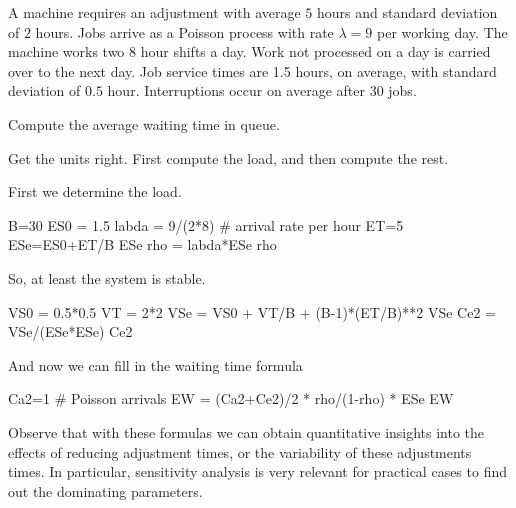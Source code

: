 \begin{exercise}
A machine requires an adjustment with average $5$ hours and standard deviation of $2$ hours. Jobs arrive as a Poisson process with rate $\lambda=9$ per working day. The machine works two $8$ hour shifts a day. Work not processed on a day is carried over to the next day. Job service times are 1.5 hours, on average, with standard deviation of $0.5$ hour. Interruptions occur on average after $30$ jobs.

Compute the average waiting time in queue.
\begin{hint}
  Get the units right. First compute the load, and then compute the rest.
\end{hint}
\begin{solution}
  First we determine the load. 
  \begin{pyconsole}
B=30
ES0 = 1.5
labda = 9/(2*8) # arrival rate per hour
ET=5
ESe=ES0+ET/B
ESe
rho = labda*ESe
rho
  \end{pyconsole}
So, at least the system is stable.

\begin{pyconsole}
VS0 = 0.5*0.5
VT = 2*2
VSe = VS0 + VT/B + (B-1)*(ET/B)**2
VSe
Ce2 = VSe/(ESe*ESe)
Ce2
\end{pyconsole}

And now we can fill in the waiting time formula
\begin{pyconsole}
Ca2=1 # Poisson arrivals
EW = (Ca2+Ce2)/2 * rho/(1-rho) * ESe
EW  
\end{pyconsole}
\end{solution}
\end{exercise}

Observe that with these formulas we can obtain quantitative insights into the effects of reducing adjustment times, or the variability of these adjustments times. In particular, sensitivity analysis is very relevant for practical cases to find out the dominating parameters. 




